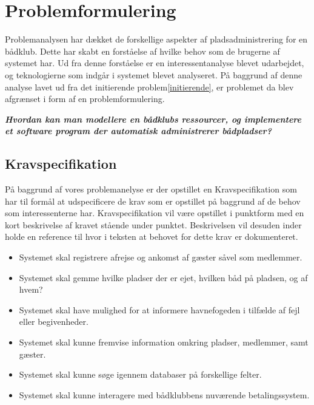 \chapter{Problemformulering}
\label{cha:problemformulering}


Problemanalysen har dækket de forskellige aspekter af pladsadministrering for en bådklub.
Dette har skabt en forståelse af hvilke behov som de brugerne af systemet har.
Ud fra denne forståelse er en interessentanalyse blevet udarbejdet, og teknologierne
som indgår i systemet blevet analyseret. På baggrund af denne analyse lavet ud fra det initierende problem\ref{initierende}, 
er problemet da blev afgrænset i form af en problemformulering.

\begin{displayquote}
	\textbf{\textit{Hvordan kan man modellere en bådklubs ressourcer, og implementere et software program der automatisk administrerer bådpladser?}}
\end{displayquote}

\section{Kravspecifikation} %
\label{sec:Kravspecifikation}

På baggrund af vores problemanelyse er der opstillet en Kravspecifikation som har til
formål at udspecificere de krav som er opstillet på baggrund af de behov som interessenterne har. 
Kravspecifikation vil være opstillet i punktform med en kort beskrivelse af kravet stående
under punktet. Beskrivelsen vil desuden inder holde en reference til hvor i teksten at
behovet for dette krav er dokumenteret.
 

\begin{itemize}
  \item Systemet skal registrere afrejse og ankomst af gæster såvel som medlemmer.
  \item Systemet skal gemme hvilke pladser der er ejet, hvilken båd på pladsen, og af hvem?
  \item Systemet skal have mulighed for at informere havnefogeden i tilfælde af fejl eller begivenheder.
  \item Systemet skal kunne fremvise information omkring pladser, medlemmer, samt gæster.
  \item Systemet skal kunne søge igennem databaser på forskellige felter.	
  \item Systemet skal kunne interagere med bådklubbens nuværende betalingssystem.
\end{itemize}



